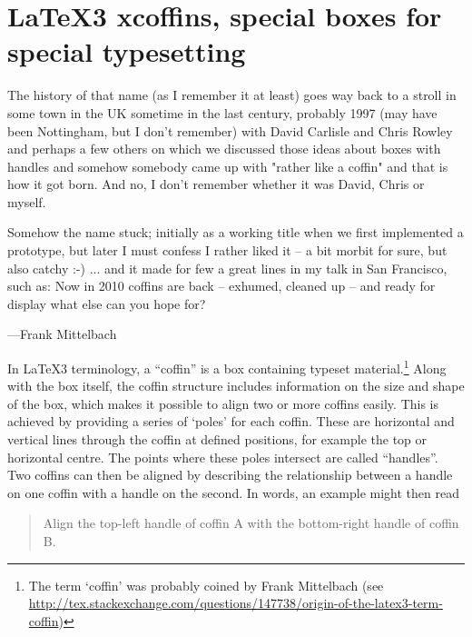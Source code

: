 \chapter{LaTeX3 xcoffins, special boxes for special typesetting}

\epigraph{The history of that name (as I remember it at least) goes way back to a stroll in some town in the UK sometime in the last century, probably 1997 (may have been Nottingham, but I don't remember) with David Carlisle and Chris Rowley and perhaps a few others on which we discussed those ideas about boxes with handles and somehow somebody came up with "rather like a coffin" and that is how it got born. And no, I don't remember whether it was David, Chris or myself.

Somehow the name stuck; initially as a working title when we first implemented a prototype, but later I must confess I rather liked it -- a bit morbit for sure, but also catchy :-) ... and it made for few a great lines in my talk in San Francisco, such as: Now in 2010 coffins are back – exhumed, cleaned up – and ready for display
what else can you hope for?}{---Frank Mittelbach}


          
 In \LaTeX3 terminology, a \enquote{coffin} is a box containing
 typeset material.\footnote{The term `coffin’ was probably coined by Frank Mittelbach (see \protect\url{http://tex.stackexchange.com/questions/147738/origin-of-the-latex3-term-coffin})} Along with the box itself, the coffin structure
 includes information on the size and shape of the box, which makes
 it possible to align two or more coffins easily. This is achieved
 by providing a series of `poles' for each coffin. These
 are horizontal and vertical lines through the coffin at defined
 positions, for example the top or horizontal centre. The points
 where these poles intersect are called \enquote{handles}. Two
 coffins can then be aligned by describing the relationship between
 a handle on one coffin with a handle on the second. In words, an
 example might then read
 \begin{quote}
   Align the top-left handle of coffin A with the bottom-right
   handle of coffin B.
 \end{quote}

